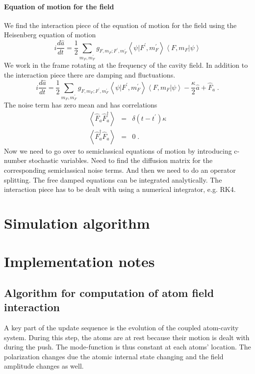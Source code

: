 \documentclass[aps, superscriptaddress, groupedaddress, preprint]{revtex4}
\begin{document}
\paragraph{Equation of motion for the field} We find the
interaction piece of the equation of motion for the field using
the Heisenberg equation of motion
\begin{equation}
i\frac{d\hat a}{dt}=
\frac{1}{2}\sum_{m_F,m_F^\prime}
g_{F, m_F;F^\prime, m_F^\prime}
\left<\psi|F^\prime, m_F^\prime\right>
\left<F, m_F|\psi\right>
\end{equation}
We work in the frame rotating at the frequency of the cavity
field.  In addition to the interaction piece there are damping
and fluctuations.
\begin{equation}
i\frac{d\hat a}{dt}=
\frac{1}{2}\sum_{m_F,m_F^\prime}
g_{F, m_F;F^\prime, m_F^\prime}
\left<\psi|F^\prime, m_F^\prime\right>
\left<F, m_F|\psi\right>
-\frac{\kappa}{2}\hat a + \hat F_a\;.
\end{equation}
The noise term has zero mean and has correlations
\begin{eqnarray}
\left<\hat F_a\hat F_a^\dagger\right>&=&\delta(t-t^\prime)\kappa\\
\left<\hat F_a^\dagger\hat F_a\right>&=&0\;.
\end{eqnarray}
Now we need to go over to semiclassical equations of motion by
introducing c-number stochastic variables.  Need to find the
diffusion matrix for the corresponding semiclassical noise terms.
And then we need to do an operator splitting.  The free damped
equations can be integrated analytically.  The interaction piece
has to be dealt with using a numerical integrator, e.g. RK4.



\section{Simulation algorithm}

\section{Implementation notes}


\subsection{Algorithm for computation of atom field interaction}

A key part of the update sequence is the evolution of the coupled
atom-cavity system.  During this step, the atoms are at rest
because their motion is dealt with during the push.  The
mode-function is thus constant at each atoms' location.  The
polarization changes due the atomic internal state changing and
the field amplitude changes as well.
\end{document}
